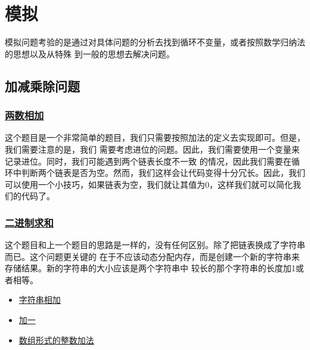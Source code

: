 \documentclass[../../main.tex]{subfiles}
\begin{document}
\setchapterpreamble[u]{\margintoc}

\chapter{模拟}

模拟问题考验的是通过对具体问题的分析去找到循环不变量，或者按照数学归纳法的思想以及从特殊
到一般的思想去解决问题。

\section{加减乘除问题}

\subsection{\href{https://leetcode.cn/problems/add-two-numbers/}{两数相加}}

这个题目是一个非常简单的题目，我们只需要按照加法的定义去实现即可。但是，我们需要注意的是，我们
需要考虑进位的问题。因此，我们需要使用一个变量来记录进位。同时，我们可能遇到两个链表长度不一致
的情况，因此我们需要在循环中判断两个链表是否为空。然而，我们这样会让代码变得十分冗长。因此，我们
可以使用一个小技巧，如果链表为空，我们就让其值为0，这样我们就可以简化我们的代码了。



\subsection{\href{https://leetcode.cn/problems/add-binary/}{二进制求和}}

这个题目和上一个题目的思路是一样的，没有任何区别。除了把链表换成了字符串而已。这个问题更关键的
在于不应该动态分配内存，而是创建一个新的字符串来存储结果。新的字符串的大小应该是两个字符串中
较长的那个字符串的长度加1或者相等。



\begin{kaobox}[title=类似题目]
  \begin{itemize}
    \item \href{https://leetcode.cn/problems/add-strings/}{字符串相加}
    \item \href{https://leetcode.cn/problems/add-to-array-form-of-integer/}{加一}
    \item \href{https://leetcode.cn/problems/add-to-array-form-of-integer/}{数组形式的整数加法}
  \end{itemize}
\end{kaobox}
\end{document}

